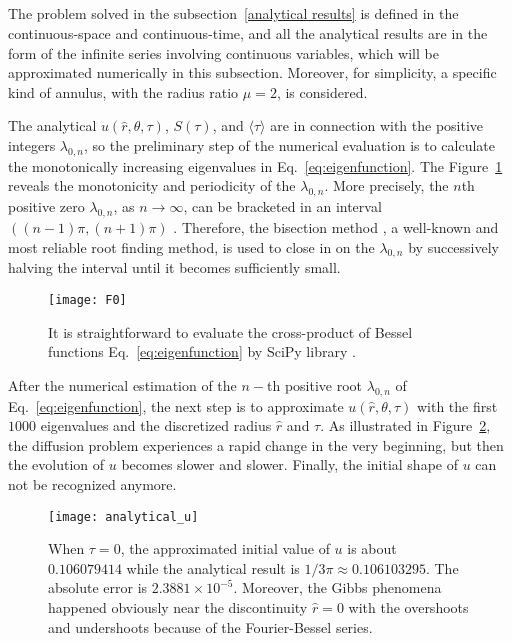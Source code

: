 
\newpage
\subsection{}\label{numerical approximation}

The problem solved in the subsection~\ref{analytical results} is
defined in the continuous-space and continuous-time, and all the
analytical results are in the form of the infinite series involving
continuous variables, which will be approximated numerically in this
subsection. Moreover, for simplicity, a specific kind of annulus, with
the radius ratio $\mu=2$, is considered.

The analytical $u(\hat r, \theta, \tau)$, $S(\tau)$, and
$\langle \tau \rangle$ are in connection with the positive integers
$\lambda_{0,n}$, so the preliminary step of the numerical evaluation
is to calculate the monotonically increasing eigenvalues in
Eq.~\ref{eq:eigenfunction}.  The Figure~\ref{fig:F0} reveals the
monotonicity and periodicity of the $\lambda_{0,n}$. More precisely,
the $n$th positive zero $\lambda_{0,n}$, as $n \rightarrow \infty $,
can be bracketed in an interval $((n-1) \pi,
(n+1) \pi)$ \cite{NIST:DLMF}. Therefore, the bisection
method \cite{2020SciPy-NMeth}, a well-known and most reliable root
finding method, is used to close in on the $\lambda_{0,n}$ by
successively halving the interval until it becomes sufficiently small.

\begin{figure}[h!]
\centering
\texttt{[image: F0]}
\caption{It is straightforward to evaluate the cross-product of
Bessel functions Eq.~\ref{eq:eigenfunction} by SciPy
library \cite{2020SciPy-NMeth}. \label{fig:F0}}
\end{figure}


After the numerical estimation of the $n-$th positive root
$\lambda_{0,n}$ of Eq.~\ref{eq:eigenfunction}, the next step is to
approximate $u(\hat r, \theta, \tau)$ with the first $1000$
eigenvalues and the discretized radius $\hat r$ and $\tau$. As
illustrated in Figure~\ref{fig:u}, the diffusion problem experiences a
rapid change in the very beginning, but then the evolution of $u$
becomes slower and slower. Finally, the initial shape of $u$ can not
be recognized anymore.

\begin{figure}
\centering
\texttt{[image: analytical\_u]}
\caption{When $\tau=0$, the approximated initial value of $u$ is about $0.106079414$ while the analytical result is $1/3\pi \approx 0.106103295$. The absolute error is $2.3881 \times 10^{-5}$. Moreover, the Gibbs phenomena \cite{fay2003gibbs} happened obviously near the discontinuity $\hat r = 0$ with the overshoots and undershoots because of the Fourier-Bessel series. \label{fig:u}}
\end{figure}


